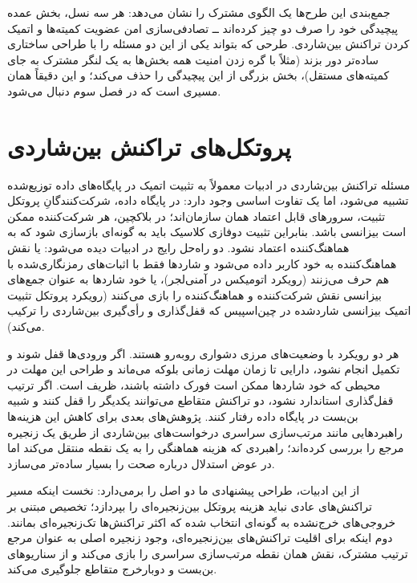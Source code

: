 جمع‌بندی این طرح‌ها یک الگوی مشترک را نشان می‌دهد: هر سه نسل، بخش عمده پیچیدگی خود را صرف دو چیز کرده‌اند ــ تصادفی‌سازی امن عضویت کمیته‌ها و اتمیک کردن تراکنش بین‌شاردی. طرحی که بتواند یکی از این دو مسئله را با طراحی ساختاری ساده‌تر دور بزند (مثلاً با گره زدن امنیت همه بخش‌ها به یک لنگر مشترک به جای کمیته‌های مستقل)، بخش بزرگی از این پیچیدگی را حذف می‌کند؛ و این دقیقاً همان مسیری است که در فصل سوم دنبال می‌شود.

\section{پروتکل‌های تراکنش بین‌شاردی}

مسئله تراکنش بین‌شاردی در ادبیات معمولاً به تثبیت اتمیک در پایگاه‌های داده توزیع‌شده تشبیه می‌شود، اما یک تفاوت اساسی وجود دارد: در پایگاه داده، شرکت‌کنندگانِ پروتکل تثبیت، سرورهای قابل اعتماد همان سازمان‌اند؛ در بلاکچین، هر شرکت‌کننده ممکن است بیزانسی باشد. بنابراین تثبیت دوفازی کلاسیک باید به گونه‌ای بازسازی شود که به هماهنگ‌کننده اعتماد نشود. دو راه‌حل رایج در ادبیات دیده می‌شود: یا نقش هماهنگ‌کننده به خود کاربر داده می‌شود و شاردها فقط با اثبات‌های رمزنگاری‌شده با هم حرف می‌زنند (رویکرد اتومیکس در آمنی‌لجر)، یا خود شاردها به عنوان جمع‌های بیزانسی نقش شرکت‌کننده و هماهنگ‌کننده را بازی می‌کنند (رویکرد پروتکل تثبیت اتمیک بیزانسی شاردشده در چین‌اسپیس که قفل‌گذاری و رأی‌گیری بین‌شاردی را ترکیب می‌کند).

هر دو رویکرد با وضعیت‌های مرزی دشواری روبه‌رو هستند. اگر ورودی‌ها قفل شوند و تکمیل انجام نشود، دارایی تا زمان مهلت زمانی بلوکه می‌ماند و طراحی این مهلت در محیطی که خود شاردها ممکن است فورک داشته باشند، ظریف است. اگر ترتیب قفل‌گذاری استاندارد نشود، دو تراکنش متقاطع می‌توانند یکدیگر را قفل کنند و شبیه بن‌بست در پایگاه داده رفتار کنند. پژوهش‌های بعدی برای کاهش این هزینه‌ها راهبردهایی مانند مرتب‌سازی سراسری درخواست‌های بین‌شاردی از طریق یک زنجیره مرجع را بررسی کرده‌اند؛ راهبردی که هزینه هماهنگی را به یک نقطه منتقل می‌کند اما در عوض استدلال درباره صحت را بسیار ساده‌تر می‌سازد.

از این ادبیات، طراحی پیشنهادی ما دو اصل را برمی‌دارد: نخست اینکه مسیر تراکنش‌های عادی نباید هزینه پروتکل بین‌زنجیره‌ای را بپردازد؛ تخصیص مبتنی بر خروجی‌های خرج‌نشده به گونه‌ای انتخاب شده که اکثر تراکنش‌ها تک‌زنجیره‌ای بمانند. دوم اینکه برای اقلیت تراکنش‌های بین‌زنجیره‌ای، وجود زنجیره اصلی به عنوان مرجع ترتیب مشترک، نقش همان نقطه مرتب‌سازی سراسری را بازی می‌کند و از سناریوهای بن‌بست و دوبارخرج متقاطع جلوگیری می‌کند.

